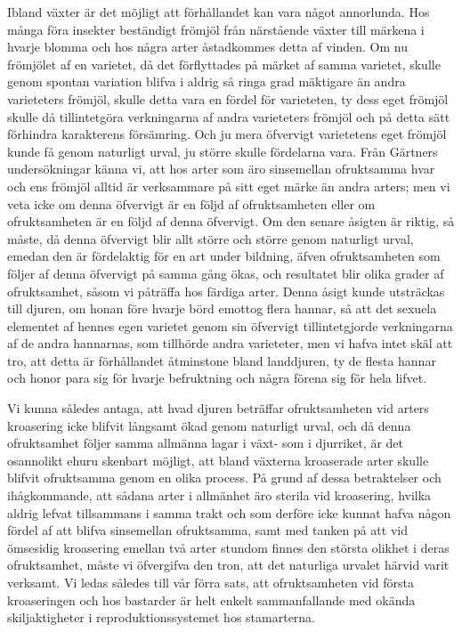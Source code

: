 Ibland växter är det möjligt att förhållandet kan vara något annorlunda. Hos många föra insekter beständigt frömjöl från närstående växter till märkena i hvarje blomma och hos några arter åstadkommes detta af vinden. Om nu frömjölet af en varietet, då det förflyttades på märket af samma varietet, skulle genom spontan variation blifva i aldrig så ringa grad mäktigare än andra varieteters frömjöl, skulle detta vara en fördel för varieteten, ty dess eget frömjöl skulle då tillintetgöra verkningarna af andra varieteters frömjöl och på detta sätt förhindra karakterens försämring. Och ju mera öfvervigt varietetens eget frömjöl kunde få genom naturligt urval, ju större skulle fördelarna vara. Från Gärtners undersökningar känna vi, att hos arter som äro sinsemellan ofruktsamma hvar och ens frömjöl alltid är verksammare på sitt eget märke än andra arters; men vi veta icke om denna öfvervigt är en följd af ofruktsamheten eller om ofruktsamheten är en följd af denna öfvervigt. Om den senare åsigten är riktig, så måste, då denna öfvervigt blir allt större och större genom naturligt urval, emedan den är fördelaktig för en art under bildning, äfven ofruktsamheten som följer af denna öfvervigt på samma gång ökas, och resultatet blir olika grader af ofruktsamhet, såsom vi påträffa hos färdiga arter. Denna åsigt kunde utsträckas till djuren, om honan före hvarje börd emottog flera hannar, så att det sexuela elementet af hennes egen varietet genom sin öfvervigt tillintetgjorde verkningarna af de andra hannarnas, som tillhörde andra varieteter, men vi hafva intet skäl att tro, att detta är förhållandet åtminstone bland landdjuren, ty de flesta hannar och honor para sig för hvarje befruktning och några förena sig för hela lifvet.

Vi kunna således antaga, att hvad djuren beträffar ofruktsamheten vid arters kroasering icke blifvit långsamt ökad genom naturligt urval, och då denna ofruktsamhet följer samma allmänna lagar i växt- som i djurriket, är det osannolikt ehuru skenbart möjligt, att bland växterna kroaserade arter skulle blifvit ofruktsamma genom en olika process. På grund af dessa betraktelser och ihågkommande, att sådana arter i allmänhet äro sterila vid kroasering, hvilka aldrig lefvat tillsammans i samma trakt och som derföre icke kunnat hafva någon fördel af att blifva sinsemellan ofruktsamma, samt med tanken på att vid ömsesidig kroasering emellan två arter stundom finnes den största olikhet i deras ofruktsamhet, måste vi öfvergifva den tron, att det naturliga urvalet härvid varit verksamt. Vi ledas således till vår förra sats, att ofruktsamheten vid första kroaseringen och hos bastarder är helt enkelt sammanfallande med okända skiljaktigheter i reproduktionssystemet hos stamarterna.

